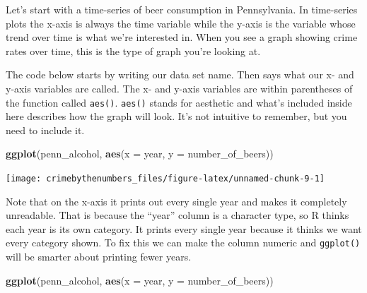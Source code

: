 \documentclass[
  12pt,
]{book}
\newenvironment{Shaded}{\begin{snugshade}}{\end{snugshade}}
\newcommand{\DataTypeTok}[1]{\textcolor[rgb]{0.27,0.27,0.27}{#1}}
\newcommand{\KeywordTok}[1]{\textcolor[rgb]{0.27,0.27,0.27}{\textbf{#1}}}
\newcommand{\NormalTok}[1]{#1}
\newcommand{\OperatorTok}[1]{\textcolor[rgb]{0.43,0.43,0.43}{\textbf{#1}}}
\newcommand{\StringTok}[1]{\textcolor[rgb]{0.5,0.5,0.5}{#1}}
\begin{document}
Let's start with a time-series of beer consumption in Pennsylvania. In time-series plots the x-axis is always the time variable while the y-axis is the variable whose trend over time is what we're interested in. When you see a graph showing crime rates over time, this is the type of graph you're looking at.

The code below starts by writing our data set name. Then says what our x- and y-axis variables are called. The x- and y-axis variables are within parentheses of the function called \texttt{aes()}. \texttt{aes()} stands for aesthetic and what's included inside here describes how the graph will look. It's not intuitive to remember, but you need to include it.

\begin{Shaded}
\begin{Highlighting}[]
\KeywordTok{ggplot}\NormalTok{(penn\_alcohol, }\KeywordTok{aes}\NormalTok{(}\DataTypeTok{x =}\NormalTok{ year,}
                         \DataTypeTok{y =}\NormalTok{ number\_of\_beers))}
\end{Highlighting}
\end{Shaded}

\begin{center}\texttt{[image: crimebythenumbers\_files/figure-latex/unnamed-chunk-9-1]} \end{center}

Note that on the x-axis it prints out every single year and makes it completely unreadable. That is because the ``year'' column is a character type, so R thinks each year is its own category. It prints every single year because it thinks we want every category shown. To fix this we can make the column numeric and \texttt{ggplot()} will be smarter about printing fewer years.

\begin{Shaded}
\end{Shaded}

\begin{Shaded}
\begin{Highlighting}[]
\KeywordTok{ggplot}\NormalTok{(penn\_alcohol, }\KeywordTok{aes}\NormalTok{(}\DataTypeTok{x =}\NormalTok{ year,}
                         \DataTypeTok{y =}\NormalTok{ number\_of\_beers))}
\end{Highlighting}
\end{Shaded}
\end{document}
